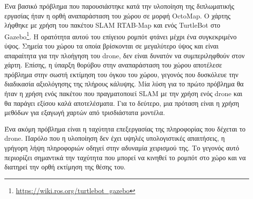 Ένα βασικό πρόβλημα που παρουσιάστηκε κατά την υλοποίηση της διπλωματικής εργασίας ήταν η ορθή αναπαράσταση του χώρου σε μορφή OctoMap. Ο χάρτης λήφθηκε με χρήση του πακέτου SLAM RTAB-Map \cite{6459608} και ενός TurtleBot στο Gazebo\footnote{\href{https://wiki.ros.org/turtlebot\_gazebo}{https://wiki.ros.org/turtlebot\_gazebo}}. Η ορατότητα αυτού του επίγειου ρομπότ φτάνει μέχρι ένα συγκεκριμένο ύψος. Σημεία του χώρου τα οποία βρίσκονται σε μεγαλύτερο ύψος και είναι απαραίτητα για την πλοήγηση του drone, δεν είναι δυνατόν να συμπεριληφθούν στον χάρτη. Επίσης, η ύπαρξη θορύβου στην αναπαράσταση του χώρου αποτέλεσε πρόβλημα στην σωστή εκτίμηση του όγκου του χώρου, γεγονός που δυσκόλευε την διαδικασία αξιολόγησης της πλήρους κάλυψης. Μία λύση για το πρώτο πρόβλημα θα ήταν η χρήση ενός πακέτου που πραγματοποιεί SLAM με την χρήση ενός drone και θα παράγει εξίσου καλά αποτελέσματα. Για το δεύτερο, μια πρόταση είναι η χρήση μεθόδων για εξαγωγή χαρτών από τρισδιάστατα μοντέλα. 

Ένα ακόμη πρόβλημα είναι η ταχύτητα επεξεργασίας της πληροφορίας που δέχεται το drone. Παρόλο που η υλοποίηση δεν έχει υψηλές υπολογιστικές απαιτήσεις, η γρήγορη λήψη πληροφοριών οδηγεί στην αδυναμία χειρισμού της. Το γεγονός αυτό περιορίζει σημαντικά την ταχύτητα που μπορεί να κινηθεί το ρομπότ στο χώρο και να διατηρεί την ορθή εκτίμηση της θέσης του.

